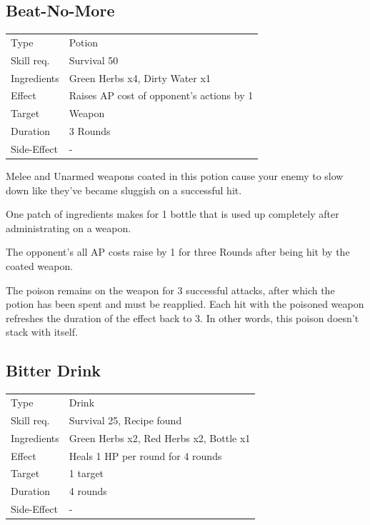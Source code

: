 \documentclass[11pt,a4paper,twocolumn]{book}
\begin{document}
\subsection*{Beat-No-More}
{
	\begin{tabu} to 75mm{| X[l,4] | X[l,8] |}
		\hline
		Type 			& Potion 													\\
        Skill req.	    & Survival 50 												\\
        Ingredients     & Green Herbs x4, Dirty Water x1							\\
        Effect     		& Raises AP cost of opponent's actions by 1 				\\
        Target      	& Weapon													\\
        Duration  		& 3 Rounds	 												\\
        Side-Effect     & -															\\ \hline
	\end{tabu}
		
}

\medskip

Melee and Unarmed weapons coated in this potion cause your enemy to slow down like they've became sluggish on a successful hit.

One patch of ingredients makes for 1 bottle that is used up completely after administrating on a weapon.

The opponent's all AP costs raise by 1 for three Rounds after being hit by the coated weapon.

The poison remains on the weapon for 3 successful attacks, after which the potion has been spent and must be reapplied. Each hit with the poisoned weapon refreshes the duration of the effect back to 3. In other words, this poison doesn't stack with itself.

\vfill


\subsection*{Bitter Drink}
{
	\begin{tabu} to 75mm{| X[l,4] | X[l,8] |}
		\hline
		Type 			& Drink 													\\
        Skill req.	    & Survival 25, Recipe found 								\\
        Ingredients     & Green Herbs x2, Red Herbs x2, Bottle x1					\\
        Effect     		& Heals 1 HP per round for 4 rounds							\\
        Target      	& 1 target													\\
        Duration  		& 4 rounds	 												\\
        Side-Effect     & -											\\ \hline
	\end{tabu}
		
}
\end{document}
